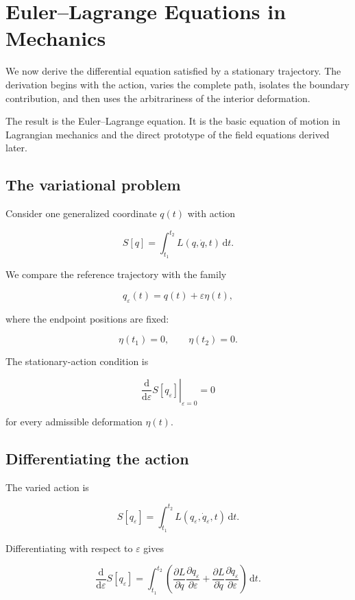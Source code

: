 \section{Euler--Lagrange Equations in Mechanics}
\label{sec:euler_lagrange_mechanics}

We now derive the differential equation satisfied by a stationary trajectory. The derivation begins with the action, varies the complete path, isolates the boundary contribution, and then uses the arbitrariness of the interior deformation.

The result is the Euler--Lagrange equation. It is the basic equation of motion in Lagrangian mechanics and the direct prototype of the field equations derived later.

\subsection{The variational problem}

Consider one generalized coordinate \(q(t)\) with action

\[
S[q]
=
\int_{t_{1}}^{t_{2}}
L(q,\dot q,t)
\,\mathrm{d}t.
\]

We compare the reference trajectory with the family

\[
q_{\varepsilon}(t)
=
q(t)+\varepsilon\eta(t),
\]

where the endpoint positions are fixed:

\[
\eta(t_{1})=0,
\qquad
\eta(t_{2})=0.
\]

The stationary-action condition is

\[
\left.
\frac{\mathrm{d}}{\mathrm{d}\varepsilon}
S[q_{\varepsilon}]
\right|_{\varepsilon=0}
=0
\]

for every admissible deformation \(\eta(t)\).

\subsection{Differentiating the action}

The varied action is

\[
S[q_{\varepsilon}]
=
\int_{t_{1}}^{t_{2}}
L(q_{\varepsilon},\dot q_{\varepsilon},t)
\,\mathrm{d}t.
\]

Differentiating with respect to \(\varepsilon\) gives

\[
\frac{\mathrm{d}}{\mathrm{d}\varepsilon}
S[q_{\varepsilon}]
=
\int_{t_{1}}^{t_{2}}
\left(
\frac{\partial L}{\partial q}
\frac{\partial q_{\varepsilon}}{\partial\varepsilon}
+
\frac{\partial L}{\partial\dot q}
\frac{\partial\dot q_{\varepsilon}}{\partial\varepsilon}
\right)
\,\mathrm{d}t.
\]


